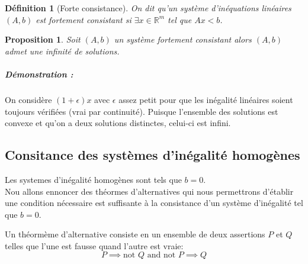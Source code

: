\documentclass[10pt,a4paper]{article}
\newtheorem{mydef}{Définition}
\newtheorem{prop}{Proposition}
\begin{document}
\begin{mydef}[Forte consistance]
On dit qu'un système d'inéquations linéaires $(A,b)$ est fortement consistant si $\exists x \in \mathbb{R}^m$ tel que $Ax < b$.
\end{mydef}

\begin{prop}
Soit $(A,b)$ un système fortement consistant alors $(A,b)$ admet une infinité de solutions.
\end{prop}
\subparagraph{Démonstration :} On considère $(1+\epsilon) x$ avec $\epsilon$ assez petit pour que les inégalité linéaires soient toujours vérifiées (vrai par continuité).
Puisque l'ensemble des solutions est convexe et qu'on a deux solutions distinctes, celui-ci est infini.

\subsection{Consitance des systèmes d'inégalité homogènes}
Les systemes d'inégalité homogènes sont tels que $b=0$.\\

Nou allons ennoncer des théormes d'alternatives qui nous permettrons d'établir une condition nécessaire est suffisante à la consistance d'un système d'inégalité tel que $b=0$.

Un théormème d'alternative consiste en un ensemble de deux assertions $P$ et $Q$ telles que l'une est fausse quand l'autre est vraie:
\[ P \implies \text{not } Q \text{ and } \text{not } P \implies Q \]
\end{document}
